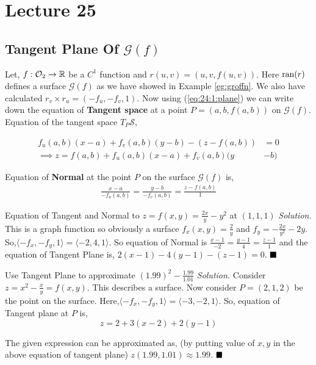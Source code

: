 \documentclass[../Analysis-3.tex]{subfiles}
\begin{document}
\chapter*{Lecture 25} %
\setcounter{chapter}{25} %
\setcounter{section}{0}
\setcounter{equation}{0}
\setcounter{figure}{0}


\section{Tangent Plane Of \texorpdfstring{$\mathcal{G}(f)$}{G(f)}}

Let, $f : \mathcal{O}_{2} \to \mathbb{R}$ be a $C^1$ function and $r(u,v) = (u,v,f(u,v))$. Here $\operatorname{ran}(r)$ defines a surface $\mathcal{G}(f)$ as we have showed in Example \ref{eg:groffn}. We also have calculated $r_v\times r_u = (-f_u,-f_v,1)$. Now using (\ref{eq:24:1:plane}) we can write down the equation of \textbf{Tangent space} at a point $P = (a,b,f(a,b))$ on $\mathcal{G}(f)$. Equation of the tangent space $T_P \mathcal{S}$,

\begin{align}
  f_u(a,b)(x-a) + f_v(a,b)(y-b)-(z-f(a,b))         & = 0 \nonumber     \\
  \implies z = f(a,b) + f_u(a,b)(x-a) + f_v(a,b)(y & -b) \label{eq:tp}
\end{align}

Equation of \textbf{Normal} at the point $P$ on the surface $\mathcal{G}(f)$ is,
\begin{align}\label{eq:np}
  \frac{x-a}{-f_u(a,b)} = \frac{y-b}{-f_v(a,b)} = \frac{z-f(a,b)}{1}
\end{align}

\begin{Eg}{Equation of Tangent and Normal to $z = f(x,y) = \frac{2x}{y}-y^2$ at $(1,1,1)$}{}
  \textit{Solution.} This is a graph function so obviously a surface $f_x(x,y) = \frac{2}{y}$ and $f_y = -\frac{2x}{y^2} -2y$. So,$\langle -f_x,- f_y,1 \rangle = \langle -2,4,1\rangle$. So equation of Normal
  is $\frac{x-1}{-2}=\frac{y-1}{4}=\frac{z-1}{1}$ and the equation of Tangent Plane is,
  $ 2(x-1)-4(y-1) -(z-1) = 0$. $\hfill \blacksquare $
\end{Eg}
\begin{Eg}{Use Tangent Plane to approximate $(1.99)^2 - \frac{1.99}{1.01}$}{}
  \textit{Solution.} Consider $z = x^2 - \frac{x}{y} = f(x,y)$. This describes a surface. Now consider $P=(2,1,2)$ be the point on the surface. Here,$\langle -f_x,- f_y,1 \rangle = \langle -3,-2,1\rangle$. So, equation of Tangent plane at $P$ is, \[z = 2 +3(x-2) +2(y-1)\]

  The given expression can be approximated as, (by putting value of $x,y$ in the above equation of tangent plane) $z(1.99,1.01) \approx 1.99$. $\hfill \blacksquare$
\end{Eg}
\end{document}
